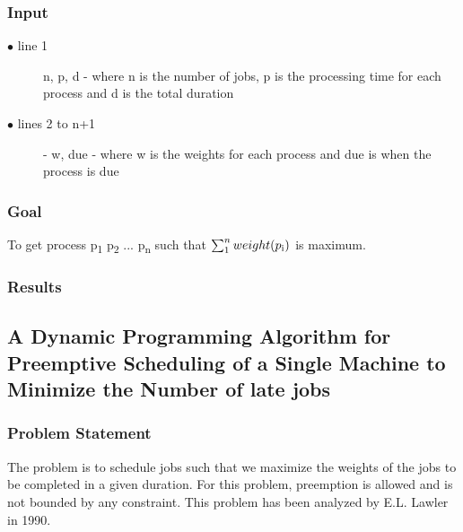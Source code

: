 \documentclass[11pt]{article}
\begin{document}
{		\subsubsection{Input}
		\begin{description}
			\item[$\bullet$ line 1]  n, p, d - where n is the number of jobs,  p is the processing time for each process and d is the total duration
			\item[$\bullet$ lines 2 to n+1] - w, due - where w is the weights for each process and due is when the process is due
		\end{description}
		
		\subsubsection{Goal}
		To get process p\textsubscript{1} p\textsubscript{2} ... p\textsubscript{n} such that $\sum_{1}^{n} weight (p\textsubscript{i})$ is maximum.
		
		\subsubsection{Results}
			
			\subsection{A Dynamic Programming Algorithm for Preemptive Scheduling of a Single Machine to Minimize the Number of late jobs}
			\subsubsection{Problem Statement}
			The problem is to schedule jobs such that we maximize the weights of the jobs to be completed in a given duration. For this problem, preemption is allowed and is not bounded by any constraint. This problem has been analyzed by E.L. Lawler in 1990.
			
}
\end{document}

